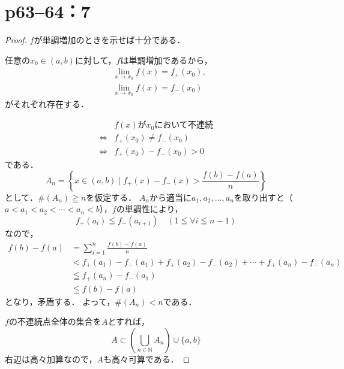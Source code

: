 \section*{p63--64：7}
\begin{leftbar}
    \begin{proof} $f$が単調増加のときを示せば十分である．

        任意の$ x_0 \in (a,b)$に対して，$f$は単調増加であるから，
        \begin{align*}
             & \lim_{x \to x_0} f(x)=f_{+} (x_0) , \\
             & \lim_{x \to x_0} f(x)=f_{-} (x_0)
        \end{align*}
        がそれぞれ存在する．

        \begin{align*}
                 & \text{$f(x)$が$x_0$において不連続}  \\
            \iff & f_{+} (x_0) \ne f_{-} (x_0) \\
            \iff & f_{+} (x_0) - f_{-} (x_0)>0
        \end{align*}
        である．
        \[
            A_n =  \left \{ x \in (a,b) \mid f_{+} (x) - f_{-} (x) > \frac{f(b)-f(a)}{n} \right \}
        \]
        として．$\# (A_n) \geqq n$を仮定する．
        $A_n$から適当に$a_1,a_2,\ldots,a_n$を取り出すと（$a<a_1 < a_2 < \cdots < a_n<b$），$f$の単調性により，
        \[
            f_{+} (a_i) \leqq f_{-} (a_{i+1}) \quad (1 \leqq \forall i \leqq n-1)
        \]
        なので，
        \begin{align*}
            f(b)-f(a) & = \sum_{i=1}^{n} \frac{f(b)-f(a)}{n}                                                         \\
                      & < f_{+} (a_1) - f_{-} (a_1) + f_{+} (a_2) - f_{-} (a_2) + \cdots + f_{+} (a_n) - f_{-} (a_n) \\
                      & \leqq f_{+} (a_n) - f_{-} (a_1)                                                              \\
                      & \leqq f(b)-f(a)
        \end{align*}
        となり，矛盾する．
        よって，$\# (A_n) < n$である．

        $f$の不連続点全体の集合を$A$とすれば，
        \[
            A \subset \left ( \bigcup_{n \in \mathbb{N}}  A_n \right ) \cup \{ a, b \}
        \]
        右辺は高々加算なので，$A$も高々可算である．
    \end{proof}
\end{leftbar}

